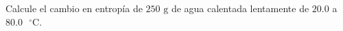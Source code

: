 \item Calcule el cambio en entropía de $250\text{ g}$ de agua calentada lentamente de $20.0$ a $80.0\text{ }^\circ\text{C}$.
